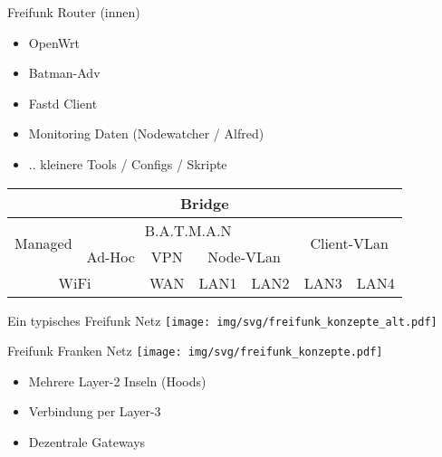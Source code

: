 \begin{frame}{Freifunk Router (innen)}
    \begin{itemize}
        \item OpenWrt
        \item Batman-Adv
        \item Fastd Client
        \item Monitoring Daten (Nodewatcher / Alfred)
        \item .. kleinere Tools / Configs / Skripte
    \end{itemize}

    \renewcommand{\arraystretch}{1.5}
    \begin{tabular}{|c|c|c|c|c|c|c|} \hline
         \multicolumn{7}{|c|}{Bridge} \\ \hline
         \multirow{2}{*}{Managed} &
         \multicolumn{4}{c|}{B.A.T.M.A.N} &
         \multicolumn{2}{c|}{\multirow{2}{*}{Client-VLan}} \\ \cline{2-5}
         & Ad-Hoc & VPN & \multicolumn{2}{c|}{Node-VLan} & \multicolumn{2}{c|}{} \\ \hline
         \multicolumn{2}{|c|}{WiFi} & WAN & LAN1 & LAN2 &
         LAN3 & LAN4 \\ \hline
    \end{tabular}
\end{frame}

\begin{frame}{Ein typisches Freifunk Netz}
    \texttt{[image: img/svg/freifunk\_konzepte\_alt.pdf]}
\end{frame}

\begin{frame}{Freifunk Franken Netz}
    \texttt{[image: img/svg/freifunk\_konzepte.pdf]}

    \begin{itemize}
        \item Mehrere Layer-2 Inseln (Hoods)
        \item Verbindung per Layer-3
        \item Dezentrale Gateways
    \end{itemize}
\end{frame}
